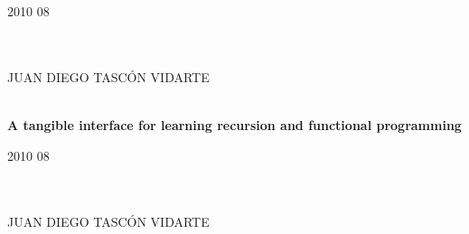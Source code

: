 
\begin{center}
  \begin{flushleft}
    \large {} \bigskip \\
    \large {} \bigskip \\
  \end{flushleft}
  \bigskip \bigskip \bigskip \bigskip
  
  \LARGE {} \vfill
  
  \Large 2010 08 \vfill
  
  \Large {} \bigskip \\
  \Large {} \bigskip \\
  \Large JUAN DIEGO TASCÓN VIDARTE
\end{center}
\thispagestyle{empty} \clearpage


\begin{center}
  \LARGE {} \bigskip \\
  
  \large \textbf{A tangible interface for learning recursion and functional programming} \vfill
  
  \large {} \vfill
  
  \Large 2010 08 \vfill
  
  \Large {} \bigskip \\
  \Large {} \bigskip \\
  \Large JUAN DIEGO TASCÓN VIDARTE
\end{center}
\thispagestyle{empty} \clearpage



